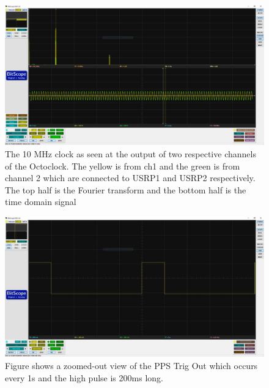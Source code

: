 \begin{figure}[H]
    \centering
    \includegraphics[width=\linewidth]{images/PPSTrigFFT.png}
    \caption{The 10 MHz clock as seen at the output of two respective channels of the Octoclock. The yellow is from ch1 and the green is from channel 2 which are connected to USRP1 and USRP2 respectively. The top half is the Fourier transform and the bottom half is the time domain signal}
    \label{fig:RefSigFFT}%
\end{figure}


\begin{figure}[H]
    \centering
    \includegraphics[width=\linewidth]{images/PPSTrig.jpg}
    \caption{Figure shows a zoomed-out view of the PPS Trig Out which occurs every 1s and the high pulse is 200ms long.}
    \label{fig:PPSTrig}%
\end{figure}



